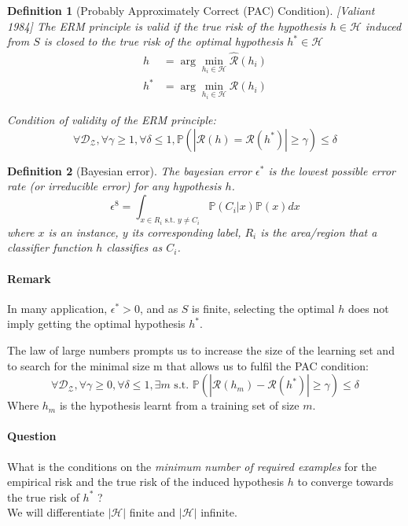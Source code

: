 \documentclass{article}
\newtheorem{defi}{Definition}
\begin{document}
\begin{defi}[Probably Approximately Correct (PAC) Condition][Valiant 1984]
The ERM principle is valid if the true risk of the hypothesis $h \in \mathcal{H}$ induced from $S$ is closed to the true risk of the optimal hypothesis $h^* \in \mathcal{H}$
\begin{align*}
h &= \arg \min_{h_i \in \mathcal{H}} \hat{\mathcal{R}}(h_i)\\
h^* &= \arg \min_{h_i\in \mathcal{H}} \mathcal{R}(h_i)
\end{align*}

Condition of validity of the ERM principle:
\[\forall \mathcal{D}_\mathcal{Z}, \forall \gamma \geq 1, \forall \delta \leq 1, \mathbb{P}(|\mathcal{R}(h)=\mathcal{R}(h^*)|\geq \gamma) \leq \delta\]
\end{defi}

\begin{defi}[Bayesian error]
The bayesian error $\epsilon^*$ is the lowest possible error rate (or irreducible error) for any hypothesis $h$.
\[\epsilon^8 = \int_{x\in R_i \text{ s.t. }y\neq C_i} \mathbb{P}(C_i|x)\mathbb{P}(x)dx\]
where $x$ is an instance, $y$ its corresponding label, $R_i$ is the area/region that a classifier function $h$ classifies as $C_i$.
\end{defi}


\paragraph{Remark}
In many application, $\epsilon^* >0$, and as $S$ is finite, selecting the optimal $h$ does not imply getting the optimal hypothesis $h^*$.
\bigskip


The law of large numbers prompts us to increase the size of the learning set and to search for the minimal size m that allows us to fulfil the PAC
condition:
\[\forall \mathcal{D}_{\mathcal{Z}}, \forall \gamma \geq 0, \forall \delta \leq 1, \exists m \text{ s.t. } \mathbb{P}(|\mathcal{R}(h_m)-\mathcal{R}(h^*)|\geq \gamma) \leq \delta\]
Where $h_m$ is the hypothesis learnt from a training set of size $m$.


\paragraph{Question} What is the conditions on the \emph{minimum number of required examples} for the empirical risk and the true risk of the induced hypothesis $h$ to converge towards the true risk of $h^*$ ?\\
We will differentiate $|\mathcal{H}|$ finite and $|\mathcal{H}|$ infinite. 
\end{document}
